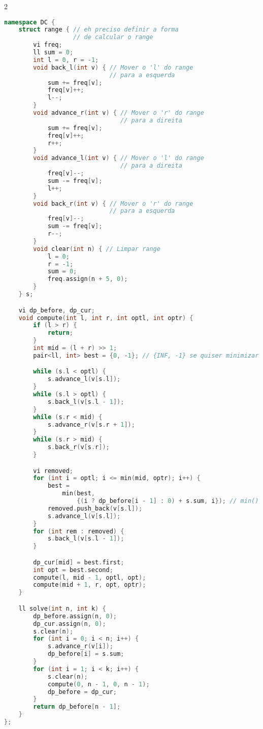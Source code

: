\documentclass[11pt, a4paper, oneside]{book}
\begin{document}
\hfill

\begin{multicols}{2}
\begin{lstlisting}[language=C++]
namespace DC {
    struct range { // eh preciso definir a forma
                   // de calcular o range
        vi freq;
        ll sum = 0;
        int l = 0, r = -1;
        void back_l(int v) { // Mover o 'l' do range
                             // para a esquerda
            sum += freq[v];
            freq[v]++;
            l--;
        }
        void advance_r(int v) { // Mover o 'r' do range
                                // para a direita
            sum += freq[v];
            freq[v]++;
            r++;
        }
        void advance_l(int v) { // Mover o 'l' do range
                                // para a direita
            freq[v]--;
            sum -= freq[v];
            l++;
        }
        void back_r(int v) { // Mover o 'r' do range
                             // para a esquerda
            freq[v]--;
            sum -= freq[v];
            r--;
        }
        void clear(int n) { // Limpar range
            l = 0;
            r = -1;
            sum = 0;
            freq.assign(n + 5, 0);
        }
    } s;

    vi dp_before, dp_cur;
    void compute(int l, int r, int optl, int optr) {
        if (l > r) {
            return;
        }
        int mid = (l + r) >> 1;
        pair<ll, int> best = {0, -1}; // {INF, -1} se quiser minimizar

        while (s.l < optl) {
            s.advance_l(v[s.l]);
        }
        while (s.l > optl) {
            s.back_l(v[s.l - 1]);
        }
        while (s.r < mid) {
            s.advance_r(v[s.r + 1]);
        }
        while (s.r > mid) {
            s.back_r(v[s.r]);
        }

        vi removed;
        for (int i = optl; i <= min(mid, optr); i++) {
            best =
                min(best,
                    {(i ? dp_before[i - 1] : 0) + s.sum, i}); // min() se quiser minimizar
            removed.push_back(v[s.l]);
            s.advance_l(v[s.l]);
        }
        for (int rem : removed) {
            s.back_l(v[s.l - 1]);
        }

        dp_cur[mid] = best.first;
        int opt = best.second;
        compute(l, mid - 1, optl, opt);
        compute(mid + 1, r, opt, optr);
    }

    ll solve(int n, int k) {
        dp_before.assign(n, 0);
        dp_cur.assign(n, 0);
        s.clear(n);
        for (int i = 0; i < n; i++) {
            s.advance_r(v[i]);
            dp_before[i] = s.sum;
        }
        for (int i = 1; i < k; i++) {
            s.clear(n);
            compute(0, n - 1, 0, n - 1);
            dp_before = dp_cur;
        }
        return dp_before[n - 1];
    }
};
\end{lstlisting}
\end{multicols}
\end{document}
